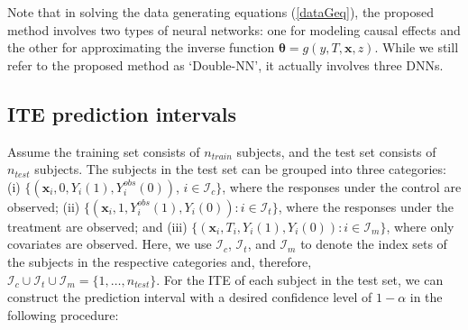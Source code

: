\documentclass[11pt]{article}
\newcommand{\bX}{{\boldsymbol X}}
\newcommand{\bx}{{\boldsymbol x}}
\newcommand{\bZ}{{\boldsymbol Z}}
\newcommand{\bw}{{\boldsymbol w}}
\newcommand{\btheta}{{\boldsymbol \theta}}
\begin{document}
Note that in solving the data generating equations (\ref{dataGeq}), the proposed method involves two types of neural networks: 
one for modeling  causal effects and the other for 
approximating the inverse  function $\btheta=g(y,T,\bx,z)$.
While we still refer to the proposed method as `Double-NN',  it actually 
involves three DNNs. 


\subsection{ITE prediction intervals} \label{ITEPsect}


Assume the training set consists of $n_{train}$ subjects,  and the test set  
consists of $n_{test}$ subjects. The subjects in the test set can be grouped into 
three categories: (i) $\{(\bx_i,0,Y_i(1),Y_i^{obs}(0))$, $i\in \mathcal{I}_c\}$, where the responses under the control are observed; 
(ii) $\{(\bx_i,1,Y_i^{obs}(1),Y_i(0)): i \in \mathcal{I}_t\}$, where 
the responses under the treatment are observed; and (iii) 
$\{(\bx_i,T_i,Y_i(1),Y_i(0)): i \in \mathcal{I}_m\}$, where only covariates are observed. 
Here, we use $\mathcal{I}_c$, $\mathcal{I}_t$, and $\mathcal{I}_m$ to denote the index sets of
the subjects in the respective categories and, therefore, $\mathcal{I}_c\cup \mathcal{I}_t\cup \mathcal{I}_m=\{1,\dots,n_{test}\}$.
For the ITE of each subject in the test set, 
we can construct the prediction interval with a desired confidence level of $1-\alpha$ in the following procedure: 
\end{document}
